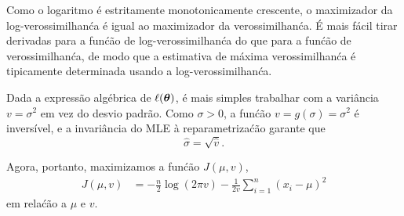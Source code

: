 \begin{exenumerate}
    \begin{solution}
        Como o logaritmo \'e estritamente monotonicamente crescente, o
        maximizador da log-verossimilhan\'ca \'e igual ao maximizador da
        verossimilhan\'ca. \'E mais f\'acil tirar derivadas para a
        fun\'c\~ao de log-verossimilhan\'ca do que para a fun\'c\~ao de verossimilhan\'ca, de modo que
        a estimativa de m\'axima verossimilhan\'ca \'e tipicamente determinada usando a log-verossimilhan\'ca.
        
        Dada a express\~ao alg\'ebrica de $\ell(\boldsymbol{\theta})$, \'e mais simples
        trabalhar com a vari\^ancia $v=\sigma^2$ em vez do desvio
        padr\~ao. Como $\sigma > 0$, a fun\'c\~ao $v = g(\sigma) = \sigma^2$
        \'e invers\'ivel, e a invari\^ancia do MLE \`a reparametriza\'c\~ao
        garante que
        $$ \hat{\sigma} = \sqrt{\hat{v}}. $$
        
        Agora, portanto, maximizamos a fun\'c\~ao $J(\mu, v)$,
        \begin{align}
            J(\mu, v) & = -\frac{n}{2} \log(2\pi v) -\frac{1}{2v} \sum_{i=1}^n (x_i-\mu)^2
        \end{align}
        em rela\'c\~ao a $\mu$ e $v$.
        

\end{solution}
\end{exenumerate}
